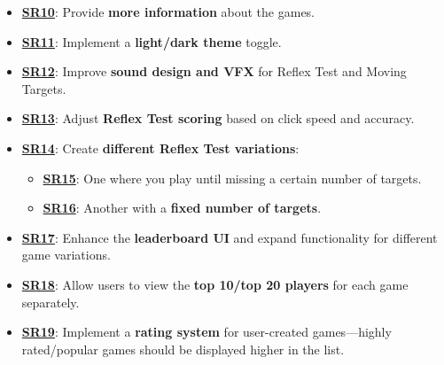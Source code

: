 \documentclass[]{VUMIFTemplateClass}
\begin{document}
\begin{itemize}
    \item 
    \hypertarget{SR10}{}\hyperlink{SR10}{\textbf{SR10}}: Provide \textbf{more information} about the games.
    
    \item 
    \hypertarget{SR11}{}\hyperlink{SR11}{\textbf{SR11}}: Implement a \textbf{light/dark theme} toggle.
    
    \item 
    \hypertarget{SR12}{}\hyperlink{SR12}{\textbf{SR12}}: Improve \textbf{sound design and VFX} for Reflex Test and Moving Targets.
    
    \item 
    \hypertarget{SR13}{}\hyperlink{SR13}{\textbf{SR13}}: Adjust \textbf{Reflex Test scoring} based on click speed and accuracy.
    
    \item 
    \hypertarget{SR14}{}\hyperlink{SR14}{\textbf{SR14}}: Create \textbf{different Reflex Test variations}:
    \begin{itemize}
        \item 
        \hypertarget{SR15}{}\hyperlink{SR15}{\textbf{SR15}}: One where you play until missing a certain number of targets.
        
        \item 
        \hypertarget{SR16}{}\hyperlink{SR16}{\textbf{SR16}}: Another with a \textbf{fixed number of targets}.
    \end{itemize}
    
    \item 
    \hypertarget{SR17}{}\hyperlink{SR17}{\textbf{SR17}}: Enhance the \textbf{leaderboard UI} and expand functionality for different game variations.
    
    \item 
    \hypertarget{SR18}{}\hyperlink{SR18}{\textbf{SR18}}: Allow users to view the \textbf{top 10/top 20 players} for each game separately.
    
    \item 
    \hypertarget{SR19}{}\hyperlink{SR19}{\textbf{SR19}}: Implement a \textbf{rating system} for user-created games—highly rated/popular games should be displayed higher in the list.
\end{itemize}





\printbibliography[title = {References and sources}]
\end{document}
